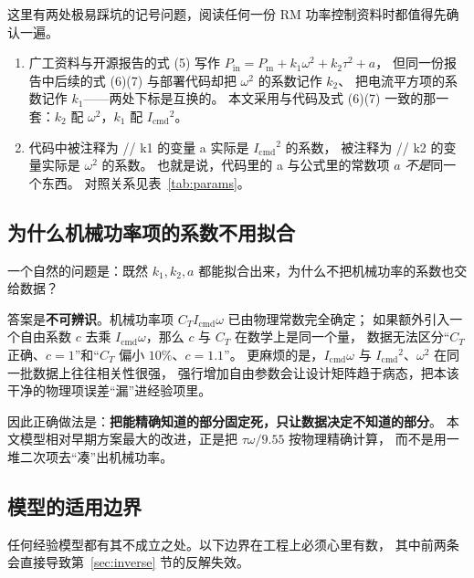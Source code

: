 \documentclass[cn,blue,11pt,device=normal]{elegantnote}
\newcommand{\code}[1]{{\ttfamily\small\def\_{\textunderscore\allowbreak}#1}}
\newcommand{\Pin}{P_{\mathrm{in}}{}}
\newcommand{\Pmech}{P_{\mathrm{m}}{}}
\newcommand{\Icmd}{I_{\mathrm{cmd}}{}}
\newcommand{\CT}{C_{T}{}}
\begin{document}
\begin{remark}[记号警示]
这里有两处极易踩坑的记号问题，阅读任何一份 RM 功率控制资料时都值得先确认一遍。
\begin{enumerate}
  \item 广工资料与开源报告的式 (5) 写作 $\Pin = \Pmech + k_1\omega^2 + k_2\tau^2 + a$，
  但同一份报告中后续的式 (6)(7) 与部署代码却把 $\omega^2$ 的系数记作 $k_2$、
  把电流平方项的系数记作 $k_1$——两处下标是互换的。
  本文采用与代码及式 (6)(7) 一致的那一套：$k_2$ 配 $\omega^2$，$k_1$ 配 $\Icmd^2$。
  \item 代码中被注释为 \code{// k1} 的变量 \code{a} 实际是 $\Icmd^2$ 的系数，
  被注释为 \code{// k2} 的变量实际是 $\omega^2$ 的系数。
  也就是说，代码里的 \code{a} 与公式里的常数项 $a$ \emph{不是}同一个东西。
  对照关系见表~\ref{tab:params}。
\end{enumerate}
\end{remark}

\subsection{为什么机械功率项的系数不用拟合}\label{sec:identifiability}

一个自然的问题是：既然 $k_1,k_2,a$ 都能拟合出来，为什么不把机械功率的系数也交给数据？

答案是\textbf{不可辨识}。机械功率项 $\CT\Icmd\omega$ 已由物理常数完全确定；
如果额外引入一个自由系数 $c$ 去乘 $\Icmd\omega$，那么 $c$ 与 $\CT$ 在数学上是同一个量，
数据无法区分“$\CT$ 正确、$c=1$”和“$\CT$ 偏小 $10\%$、$c=1.1$”。
更麻烦的是，$\Icmd\omega$ 与 $\Icmd^2$、$\omega^2$ 在同一批数据上往往相关性很强，
强行增加自由参数会让设计矩阵趋于病态，把本该干净的物理项误差“漏”进经验项里。

因此正确做法是：\textbf{把能精确知道的部分固定死，只让数据决定不知道的部分}。
本文模型相对早期方案最大的改进，正是把 $\tau\omega/9.55$ 按物理精确计算，
而不是用一堆二次项去“凑”出机械功率。

\subsection{模型的适用边界}

任何经验模型都有其不成立之处。以下边界在工程上必须心里有数，
其中前两条会直接导致第~\ref{sec:inverse} 节的反解失效。
\end{document}
